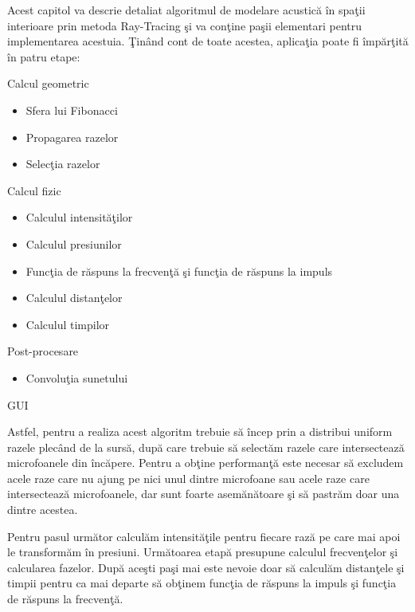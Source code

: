 Acest capitol va descrie detaliat algoritmul de modelare acustic\u{a} \^{i}n spa\c{t}ii interioare prin metoda Ray-Tracing \c{s}i va con\c{t}ine pa\c{s}ii elementari pentru implementarea acestuia. \c{T}in\^{a}nd cont de toate acestea, aplica\c{t}ia poate fi \^{i}mp\u{a}r\c{t}it\u{a} \^{i}n patru etape:
\begin{enumerate}
	\utb Calcul geometric
	\begin{itemize}
		\item Sfera lui Fibonacci
		\item Propagarea razelor
		\item Selec\c{t}ia razelor
	\end{itemize}
	\utb Calcul fizic
	\begin{itemize}
		\item Calculul intensit\u{a}\c{t}ilor
		\item Calculul presiunilor
		\item Func\c{t}ia de r\u{a}spuns la frecven\c{t}\u{a} \c{s}i func\c{t}ia de r\u{a}spuns la impuls
		\item Calculul distan\c{t}elor
		\item Calculul timpilor
	\end{itemize}
	\utb Post-procesare
	\begin{itemize}
		\item Convolu\c{t}ia sunetului
	\end{itemize}
	\utb GUI
\end{enumerate}
\bigskip

Astfel, pentru a realiza acest algoritm trebuie s\u{a} \^{i}ncep prin a distribui uniform razele plec\^{a}nd de la surs\u{a}, dup\u{a} care trebuie s\u{a} select\u{a}m razele care intersecteaz\u{a} microfoanele din \^{i}nc\u{a}pere. Pentru a ob\c{t}ine performan\c{t}\u{a} este necesar s\u{a} excludem acele raze care nu ajung pe nici unul dintre microfoane sau acele raze care intersecteaz\u{a} microfoanele, dar sunt foarte asem\u{a}n\u{a}toare \c{s}i s\u{a} pastr\u{a}m doar una dintre acestea.

\bigskip
Pentru pasul urm\u{a}tor calcul\u{a}m intensit\u{a}\c{t}ile pentru fiecare raz\u{a} pe care mai apoi le transform\u{a}m \^{i}n presiuni. Urm\u{a}toarea etap\u{a} presupune calculul frecven\c{t}elor \c{s}i calcularea fazelor. Dup\u{a} ace\c{s}ti pa\c{s}i mai este nevoie doar s\u{a} calcul\u{a}m distan\c{t}ele \c{s}i timpii pentru ca mai departe s\u{a} ob\c{t}inem func\c{t}ia de r\u{a}spuns la impuls \c{s}i func\c{t}ia de r\u{a}spuns la frecven\c{t}\u{a}.


